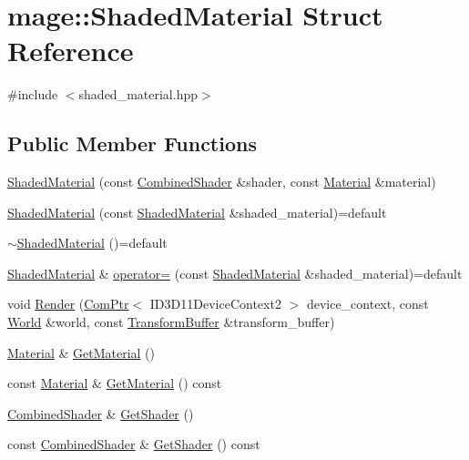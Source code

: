 \hypertarget{structmage_1_1_shaded_material}{}\section{mage\+:\+:Shaded\+Material Struct Reference}
\label{structmage_1_1_shaded_material}


{\ttfamily \#include $<$shaded\+\_\+material.\+hpp$>$}

\subsection*{Public Member Functions}
\begin{DoxyCompactItemize}
\item 
\hyperlink{structmage_1_1_shaded_material_a58594c0008865c68efc6ff6868016236}{Shaded\+Material} (const \hyperlink{structmage_1_1_combined_shader}{Combined\+Shader} \&shader, const \hyperlink{structmage_1_1_material}{Material} \&material)
\item 
\hyperlink{structmage_1_1_shaded_material_a8bd45b489933e89f0a16f79e29161c27}{Shaded\+Material} (const \hyperlink{structmage_1_1_shaded_material}{Shaded\+Material} \&shaded\+\_\+material)=default
\item 
\hyperlink{structmage_1_1_shaded_material_ac7be54322faed90a07b26225e270e571}{$\sim$\+Shaded\+Material} ()=default
\item 
\hyperlink{structmage_1_1_shaded_material}{Shaded\+Material} \& \hyperlink{structmage_1_1_shaded_material_ade9ec3ee6aae198e695240a5b89a0d72}{operator=} (const \hyperlink{structmage_1_1_shaded_material}{Shaded\+Material} \&shaded\+\_\+material)=default
\item 
void \hyperlink{structmage_1_1_shaded_material_a64cdb2b88a2cccbc25e35552fa0ff532}{Render} (\hyperlink{namespacemage_ae74f374780900893caa5555d1031fd79}{Com\+Ptr}$<$ I\+D3\+D11\+Device\+Context2 $>$ device\+\_\+context, const \hyperlink{classmage_1_1_world}{World} \&world, const \hyperlink{structmage_1_1_transform_buffer}{Transform\+Buffer} \&transform\+\_\+buffer)
\item 
\hyperlink{structmage_1_1_material}{Material} \& \hyperlink{structmage_1_1_shaded_material_a785d01e0156c6aba84d479917b62ab03}{Get\+Material} ()
\item 
const \hyperlink{structmage_1_1_material}{Material} \& \hyperlink{structmage_1_1_shaded_material_a936a1cb2c79b28818814ac504d059ea3}{Get\+Material} () const
\item 
\hyperlink{structmage_1_1_combined_shader}{Combined\+Shader} \& \hyperlink{structmage_1_1_shaded_material_a1138a96b289a841920f39553ebb230d1}{Get\+Shader} ()
\item 
const \hyperlink{structmage_1_1_combined_shader}{Combined\+Shader} \& \hyperlink{structmage_1_1_shaded_material_ac03da6f1dfd81fc19da5a8f8214662ee}{Get\+Shader} () const
\end{DoxyCompactItemize}
